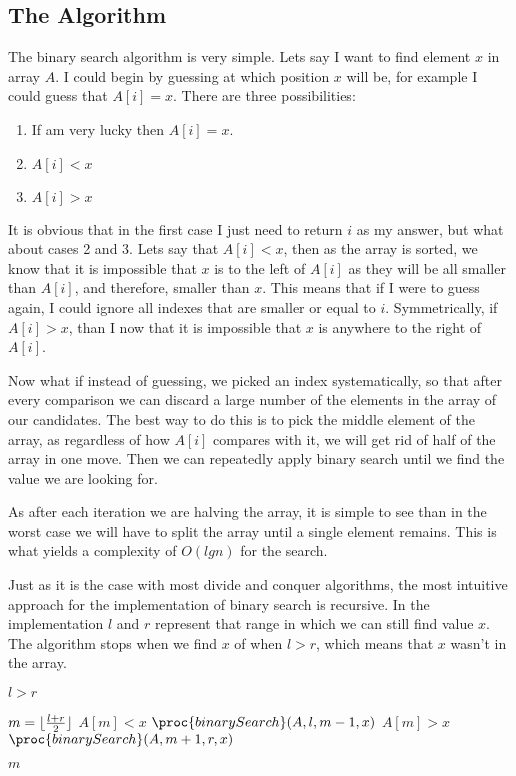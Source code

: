 \documentclass{article}
\DeclarePairedDelimiter\floor{\lfloor}{\rfloor}
\begin{document}
\subsection{The Algorithm}

The binary search algorithm is very simple. Lets say I want to find element $x$ in array $A$. I could begin by guessing at which position $x$ will be, for example I could guess that $A[i] = x$. There are three possibilities:

\begin{enumerate}
	\item If am very lucky then $A[i] = x$.
	\item $A[i] < x$
	\item $A[i] > x$
\end{enumerate}

It is obvious that in the first case I just need to return $i$ as my answer, but what about cases 2 and 3. Lets say that $A[i] < x$, then as the array is sorted, we know that it is impossible that $x$ is to the left of $A[i]$ as they will be all smaller than $A[i]$, and therefore, smaller than $x$. This means that if I were to guess again, I could ignore all indexes that are smaller or equal to $i$. Symmetrically, if $A[i] > x$, than I now that it is impossible that $x$ is anywhere to the right of $A[i]$.

Now what if instead of guessing, we picked an index systematically, so that after every comparison we can discard a large number of the elements in the array of our candidates. The best way to do this is to pick the middle element of the array, as regardless of how $A[i]$ compares with it, we will get rid of half of the array in one move. Then we can repeatedly apply binary search until we find the value we are looking for.

As after each iteration we are halving the array, it is simple to see than in the worst case we will have to split the array until a single element remains. This is what yields a complexity of $O(lgn)$ for the search.

Just as it is the case with most divide and conquer algorithms, the most intuitive approach for the implementation of binary search is recursive. In the implementation $l$ and $r$ represent that range in which we can still find value $x$. The algorithm stops when we find $x$ of when $l > r$, which means that $x$ wasn't in the array.

\begin{codebox}
	\li \If $l > r$ \li \Then
	\End

	\li $m = \floor{\frac{l + r}{2}}$
	\li \If $A[m] < x$ \li \Then 
		\Return $\proc{binarySearch}(A, l, m - 1, x)$
	\End
	\li \If $A[m] > x$ \li \Then 
		\Return $\proc{binarySearch}(A, m + 1, r, x)$
	\End
	
	\li \Return $m$
\end{codebox}
\end{document}
